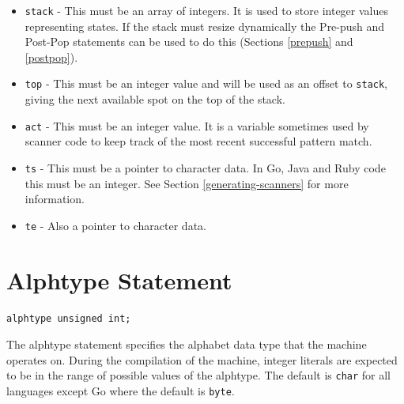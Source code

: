 \documentclass[letterpaper,11pt,oneside]{book}
\newcommand{\verbspace}{\vspace{10pt}}
\begin{document}
\begin{itemize}
\item \verb|stack| - This must be an array of integers. It is used to store
integer values representing states. If the stack must resize dynamically the
Pre-push and Post-Pop statements can be used to do this (Sections
\ref{prepush} and \ref{postpop}).

\item \verb|top| - This must be an integer value and will be used as an offset
to \verb|stack|, giving the next available spot on the top of the stack.

\item \verb|act| - This must be an integer value. It is a variable sometimes
used by scanner code to keep track of the most recent successful pattern match.

\item \verb|ts| - This must be a pointer to character data. In Go, Java and
Ruby code this must be an integer. See Section \ref{generating-scanners} for
more information.

\item \verb|te| - Also a pointer to character data.

\end{itemize}

\section{Alphtype Statement}

\begin{verbatim}
alphtype unsigned int;
\end{verbatim}
\verbspace

The alphtype statement specifies the alphabet data type that the machine
operates on. During the compilation of the machine, integer literals are
expected to be in the range of possible values of the alphtype. The default
is \verb|char| for all languages except Go where the default is \verb|byte|.
\end{document}

